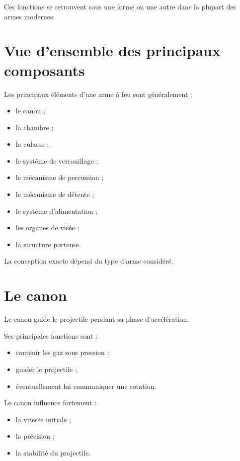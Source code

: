 Ces fonctions se retrouvent sous une forme ou une autre dans la plupart des
armes modernes.

\section{Vue d'ensemble des principaux composants}

Les principaux éléments d'une arme à feu sont généralement :

\begin{itemize}
    \item le canon ;
    \item la chambre ;
    \item la culasse ;
    \item le système de verrouillage ;
    \item le mécanisme de percussion ;
    \item le mécanisme de détente ;
    \item le système d'alimentation ;
    \item les organes de visée ;
    \item la structure porteuse.
\end{itemize}

La conception exacte dépend du type d'arme considéré.

\section{Le canon}

Le canon guide le projectile pendant sa phase d'accélération.

Ses principales fonctions sont :

\begin{itemize}
    \item contenir les gaz sous pression ;
    \item guider le projectile ;
    \item éventuellement lui communiquer une rotation.
\end{itemize}

Le canon influence fortement :

\begin{itemize}
    \item la vitesse initiale ;
    \item la précision ;
    \item la stabilité du projectile.
\end{itemize}

